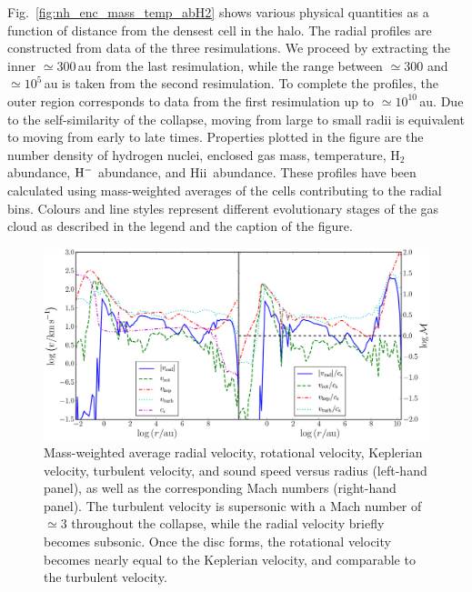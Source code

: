 \documentclass[useAMS,usenatbib]{mnras}
\newcommand{\HH}{\text{H}_2}          %
\newcommand{\HM}{{\rm H}^{-}}     %
\newcommand{\HII}{H{\sc ii}~}    %
\begin{document}
Fig.~\ref{fig:nh_enc_mass_temp_abH2} shows various physical quantities as a function of distance from the densest cell in the halo. The radial profiles are constructed from data of the three resimulations. We proceed by extracting the inner $\simeq 300\,$au from the last resimulation, while the range between $\simeq 300$ and $\simeq 10^5\,$au is taken from the second resimulation. To complete the profiles, the outer region corresponds to data from the first resimulation up to $\simeq 10^{10}\,$au. Due to the self-similarity of the collapse, moving from large to small radii is equivalent to moving from early to late times. Properties plotted in the figure are the number density of hydrogen nuclei, enclosed gas mass, temperature, $\HH$ abundance, $\HM$ abundance, and \HII abundance. These profiles have been calculated using mass-weighted averages of the cells contributing to the radial bins. Colours and line styles represent different evolutionary stages of the gas cloud as described in the legend and the caption of the figure.

\begin{figure}
\begin{center}
\includegraphics[scale=0.53]{./f4.png}
\caption{Mass-weighted average radial velocity, rotational velocity, Keplerian velocity, turbulent velocity, and sound speed versus radius (left-hand panel), as well as the corresponding Mach numbers (right-hand panel). The turbulent velocity is supersonic with a Mach number of $\simeq 3$ throughout the collapse, while the radial velocity briefly becomes subsonic. Once the disc forms, the rotational velocity becomes nearly equal to the Keplerian velocity, and comparable to the turbulent velocity.}
\label{fig:velocities}
\end{center}
\end{figure}
\end{document}
